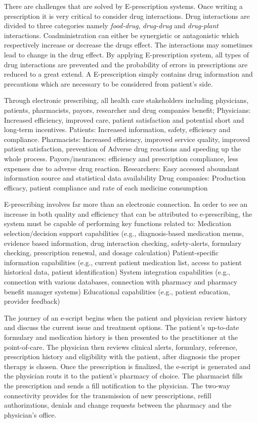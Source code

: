 \documentclass[10pt, conference, compsocconf]{IEEEtran}
\begin{document}
There are challenges that are solved by E-prescription systems.
Once writing a prescription it is very critical to consider drug interactions.
Drug interactions are divided to three categories namely \emph{food-drug}, \emph{drug-drug} and \emph{drug-plant} interactions.
Coadministration can either be synergistic or antagonistic which respectively increase or decrease the drugs effect.
The interactions may sometimes lead to change in the drug effect.
By applying E-prescription system, all types of drug interactions are prevented and the probability of errors in prescriptions are reduced to a great extend.
A E-prescription simply contains drug information and precautions which are necessary to be considered from patient's side.

Through electronic prescribing, all health care stakeholders including physicians, patients, pharmacists, payors, researcher and drug companies benefit;
Physicians: Increased efficiency, improved care, patient satisfaction and potential short and long-term incentives.
Patients: Increased information, safety, efficiency and compliance.
Pharmacists: Increased efficiency, improved service quality, improved patient satisfaction,  prevention of Adverse drug reactions and speeding up the whole process.
Payors/insurances: efficiency and prescription compliance, less expenses due to adverse drug reaction.
Researchers: Easy accessed aboundant information source and statistical data availability
Drug companies: Production efficacy, patient compliance and rate of each medicine consumption

E-prescribing involves far more than an electronic connection. In order to see an increase in both quality and efficiency that can be attributed to e-prescribing, the system must be capable of performing key functions related to:
Medication selection/decision support capabilities (e.g., diagnosis-based medication menus, evidence based information, drug interaction checking, safety-alerts, formulary checking, prescription renewal, and dosage calculation)
Patient-specific information capabilities (e.g., current patient medication list, access to patient historical data, patient identification)
System integration capabilities (e.g., connection with various databases, connection with pharmacy and pharmacy benefit manager systems)
Educational capabilities (e.g., patient education, provider feedback)

The journey of an e-script begins when the patient and physician review history and discuss the current issue and treatment options. The patient’s up-to-date formulary and medication history is then presented to the practitioner at the point-of-care.
The physician then reviews clinical alerts, formulary, reference, prescription history and eligibility with the patient, after diagnosis the proper therapy is chosen.
Once the prescription is finalized, the e-script is generated and the physician routs it to the patient’s pharmacy of choice. The pharmacist fills the prescription and sends a fill notification to the physician.
The two-way connectivity provides for the transmission of new prescriptions, refill authorizations, denials and change requests between the pharmacy and the physician’s office.
\end{document}
